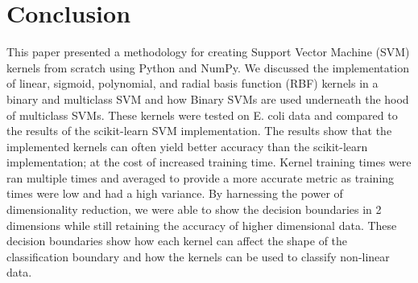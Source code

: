 \documentclass[12pt]{article}
\begin{document}
\section{Conclusion}
This paper presented a methodology for creating Support Vector Machine (SVM) kernels from scratch using Python and NumPy.
We discussed the implementation of linear, sigmoid, polynomial, and radial basis function (RBF) kernels in a binary and multiclass SVM
and how Binary SVMs are used underneath the hood of multiclass SVMs. These kernels were tested on E. coli data and compared to the results
of the scikit-learn SVM implementation. The results show that the implemented kernels can often yield better accuracy than the scikit-learn
implementation; at the cost of increased training time. Kernel training times were ran multiple times and averaged to provide a more
accurate metric as training times were low and had a high variance. By harnessing the power of dimensionality reduction, we were
able to show the decision boundaries in 2 dimensions while still retaining the accuracy of higher dimensional data. These 
decision boundaries show how each kernel can affect the shape of the classification boundary and how the kernels can be used to
classify non-linear data.
\end{document}
